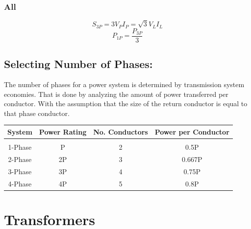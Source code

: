 \documentclass[a5paper]{article}
\begin{document}
	\subsubsection{All}
	$$S_{3P}=3V_{P}I_{P}=\sqrt{3}V_{L}I_{L}$$
	$$P_{1P}=\frac{P_{3P}}{3}$$
	\subsection{Selecting Number of Phases:}
	The number of phases for a power system is determined by transmission system economies. That is done by analyzing the amount of power transferred per conductor. With the assumption that the size of the return conductor is equal to that phase conductor.
	\begin{center}
	\begin{tabular}{ c | c c c }
		System & Power Rating & No. Conductors & Power per Conductor\\
		\hline\\
		1-Phase & P & 2 & 0.5P\\
		2-Phase & 2P & 3 & 0.667P\\
		3-Phase & 3P & 4 & 0.75P\\
		4-Phase & 4P & 5 & 0.8P
	\end{tabular}
	\end{center}

	\section{Transformers}
\end{document}
